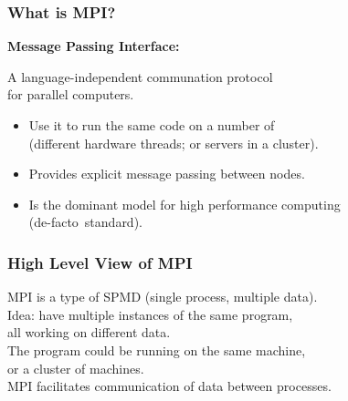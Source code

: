 \begin{frame}
  \frametitle{What is MPI?}



  {\bf Message Passing Interface:}

  A language-independent communation protocol\\ for parallel computers.

  \begin{itemize}
    \item Use it to run the same code on a number of \\ \qquad (different hardware
      threads; or servers in a cluster).
    \item Provides explicit message passing between nodes.
    \item Is the dominant model for high performance computing\\ \qquad (de-facto~standard).
  \end{itemize}
  
\end{frame}

\begin{frame}
  \frametitle{High Level View of MPI}

  

    MPI is a type of SPMD (single process, multiple data).\\[2em]

    Idea: have multiple instances of the same program, \\ all working on
      different data.\\[0.5em]

    The program could be running on the same machine, \\ or a cluster of machines.\\[0.5em]

    MPI facilitates communication of data between processes.
  
\end{frame}


